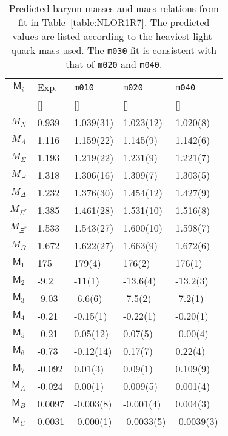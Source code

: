 \documentclass[twocolumn,nofootinbib,prd,aps,superscriptaddress,tightenlines]{revtex4}
\def\mreln{ \mathsf{M} }
\def\D{\Delta}
\def\L{\Lambda}
\def\S{\Sigma}
\def\O{\Omega}
\def\ufont#1{\text{#1}}
\begin{document}
\begin{table}
\caption{\label{table:R1R7Predictions} Predicted baryon masses and mass relations from fit in Table~\ref{table:NLOR1R7}.  The predicted values are listed according to the heaviest light-quark mass used.  The \texttt{m030} fit is consistent with that of \texttt{m020} and \texttt{m040}.}
\begin{ruledtabular}
\begin{tabular}{|c|l|lll|}
$\mreln_i$& Exp.& \texttt{m010}& \texttt{m020}& \texttt{m040} \\
&  [\ufont{GeV}]&  [\ufont{GeV}]&  [\ufont{GeV}]&  [\ufont{GeV}] \\
\hline
$M_N$& 0.939& 1.039(31)& 1.023(12)& 1.020(8) \\
$M_\L$& 1.116& 1.159(22)& 1.145(9)& 1.142(6) \\
$M_\S$& 1.193& 1.219(22)& 1.231(9)& 1.221(7) \\
$M_\Xi$& 1.318& 1.306(16)& 1.309(7)& 1.303(5) \\
$M_\D$& 1.232& 1.376(30)& 1.454(12)& 1.427(9) \\
$M_{\S^*}$& 1.385& 1.461(28)& 1.531(10)& 1.516(8) \\
$M_{\Xi^*}$& 1.533& 1.543(27)& 1.600(10)& 1.598(7) \\
$M_\O$&1.672& 1.622(27)& 1.663(9)& 1.672(6) \\
\hline
$\mreln_1$& 175& 179(4)& 176(2)& 176(1)\\
$\mreln_2$& -9.2& -11(1)& -13.6(4)& -13.2(3)\\
$\mreln_3$& -9.03& -6.6(6)& -7.5(2)& -7.2(1)\\
$\mreln_4$& -0.21& -0.15(1)& -0.22(1)& -0.20(1)\\
$\mreln_5$& -0.21& 0.05(12)& 0.07(5)& -0.00(4)\\
$\mreln_6$& -0.73& -0.12(14)& 0.17(7)& 0.22(4)\\
$\mreln_7$& -0.092& 0.01(3)& 0.09(1)& 0.109(9)\\
\hline
$\mreln_A$& -0.024& 0.00(1)& 0.009(5)& 0.001(4)\\
$\mreln_B$& 0.0097& -0.003(8)& -0.001(4)& 0.004(3)\\
$\mreln_C$& 0.0031& -0.000(1)& -0.0033(5)& -0.0039(3)\\
\end{tabular}
\end{ruledtabular}
\end{table}
\end{document}
